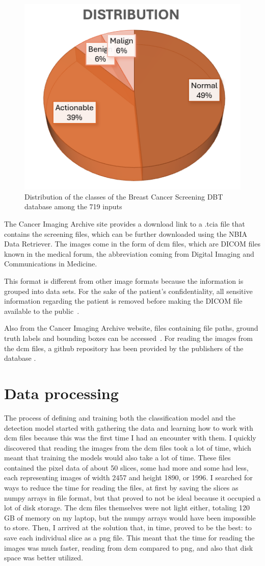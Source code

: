 \begin{figure}[hb!]
    \centering
    \includegraphics[width=0.5\linewidth]{figures/Figure36.png}
    \caption{Distribution of the classes of the Breast Cancer Screening DBT database among the 719 inputs}
    \label{fig:fig30}
\end{figure}

The Cancer Imaging Archive site provides a download link to a .tcia file that contains the screening files, which can be further downloaded using the NBIA Data Retriever. The images come in the form of dcm files, which are DICOM files known in the medical forum, the abbreviation coming from Digital Imaging and Communications in Medicine.

This format is different from other image formats because the information is grouped into data sets. For the sake of the patient's confidentiality, all sensitive information regarding the patient is removed before making the DICOM file available to the public~\cite{carte6}.

Also from the Cancer Imaging Archive website, files containing file paths, ground truth labels and bounding boxes can be accessed~\cite{carte7}. For reading the images from the dcm files, a github repository has been provided by the publishers of the data\-base \cite{link5}.

\section{Data processing}

The process of defining and training both the classification model and the detection model started with gathering the data and learning how to work with dcm files because this was the first time I had an encounter with them. I quickly discovered that reading the images from the dcm files took a lot of time, which meant that training the models would also take a lot of time. These files contained the pixel data of about 50 slices, some had more and some had less, each representing images of width 2457 and height 1890, or 1996. I searched for ways to reduce the time for reading the files, at first by saving the slices as numpy arrays in file format, but that proved to not be ideal because it occupied a lot of disk storage. The dcm files themselves were not light either, totaling 120 GB of memory on my laptop, but the numpy arrays would have been impossible to store. Then, I arrived at the solution that, in time, proved to be the best: to save each individual slice as a png file. This meant that the time for reading the images was much faster, reading from dcm compared to png, and also that disk space was better utilized.

